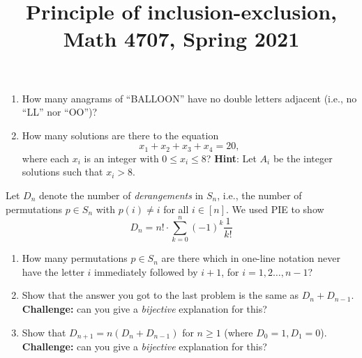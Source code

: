 \documentclass[11pt]{article}
\title{Principle of inclusion-exclusion, \\Math 4707, Spring 2021}
\date{}
\begin{document}
\maketitle

\thispagestyle{empty}



\begin{enumerate}

\item How many anagrams of ``BALLOON'' have no double letters adjacent (i.e., no ``LL'' nor ``OO'')?

\item How many solutions are there to the equation
\[ x_1 + x_2 + x_3 + x_4  = 20 ,\]
where each $x_i$ is an integer with $0\leq x_i \leq 8$? {\bf Hint}: Let $A_i$ be the integer solutions such that $x_i > 8$.

\end{enumerate}

Let $D_n$ denote the number of \emph{derangements} in $S_n$, i.e., the number of permutations $p \in S_n$ with $p(i)\neq i$ for all $i\in [n]$. We used PIE to show
\[ D_n = n! \cdot \sum_{k=0}^{n} (-1)^k \frac{1}{k!}\]

\begin{enumerate}

\addtocounter{enumi}{2}

\item  How many permutations $p \in S_n$ are there which in one-line notation never have the letter $i$ immediately followed by $i+1$, for $i=1,2\ldots,n-1$? 

\item Show that the answer you got to the last problem is the same as $D_n + D_{n-1}$. {\bf Challenge: } can you give a \emph{bijective} explanation for this?

\item Show that $D_{n+1} = n(D_n + D_{n-1})$ for $n \geq 1$ (where $D_0=1,D_1=0$). {\bf Challenge: } can you give a \emph{bijective} explanation for this?

\end{enumerate}
\end{document}
